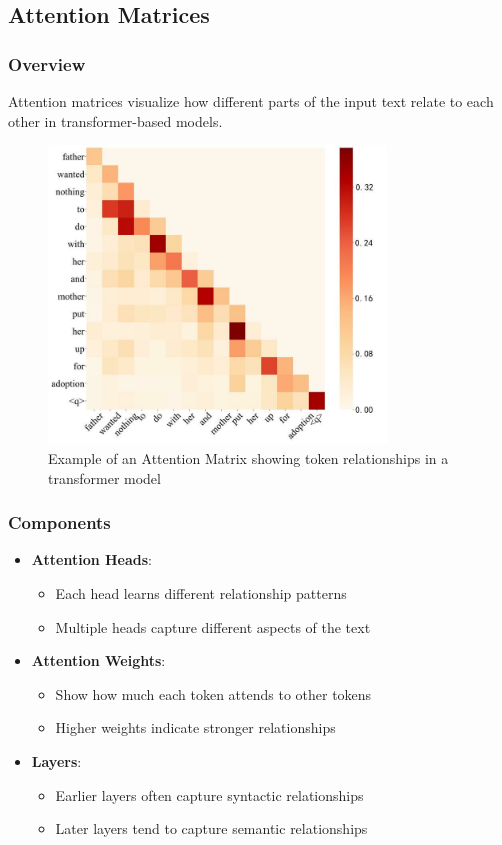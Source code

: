 \documentclass{article}
\begin{document}
\subsection{Attention Matrices}

\subsubsection{Overview}
Attention matrices visualize how different parts of the input text relate to each other in transformer-based models.

\begin{figure}[h]
    \centering
    \includegraphics[width=0.8\textwidth]{images/am.jpg}
    \caption{Example of an Attention Matrix showing token relationships in a transformer model}
    \label{fig:attention_matrix}
\end{figure}

\subsubsection{Components}
\begin{itemize}
    \item \textbf{Attention Heads}:
        \begin{itemize}
            \item Each head learns different relationship patterns
            \item Multiple heads capture different aspects of the text
        \end{itemize}
    \item \textbf{Attention Weights}:
        \begin{itemize}
            \item Show how much each token attends to other tokens
            \item Higher weights indicate stronger relationships
        \end{itemize}
    \item \textbf{Layers}:
        \begin{itemize}
            \item Earlier layers often capture syntactic relationships
            \item Later layers tend to capture semantic relationships
        \end{itemize}
\end{itemize}
\end{document}
